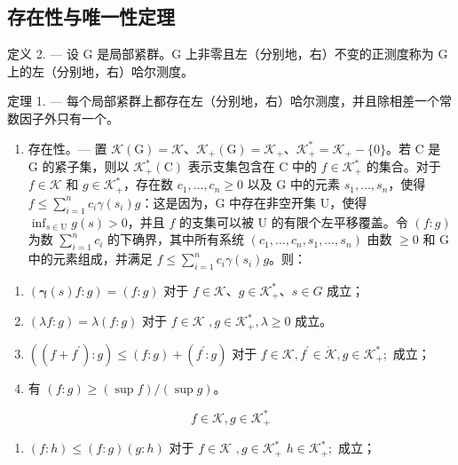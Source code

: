 \subsection{存在性与唯一性定理}

定义 2. --- 设 G 是局部紧群。G 上非零且左（分别地，右）不变的正测度称为 G 上的左（分别地，右）哈尔测度。

定理 1. --- 每个局部紧群上都存在左（分别地，右）哈尔测度，并且除相差一个常数因子外只有一个。

\begin{enumerate}
\def\labelenumi{\Alph{enumi})}
\tightlist
\item
  存在性。--- 置 \(\mathcal{K}(\mathrm{G}) = \mathcal{K}\)、\(\mathcal{K}_{+}(\mathrm{G}) = \mathcal{K}_{+}\)、\(\mathcal{K}_{+}^{*} = \mathcal{K}_{+} - \{0\}\)。若 C 是 G 的紧子集，则以 \(\mathcal{K}_{+}^{*}(\mathrm{C})\) 表示支集包含在 C 中的 \(f \in \mathcal{K}_{+}^{*}\) 的集合。对于 \(f \in \mathcal{K}\) 和 \(g \in \mathcal{K}_{+}^{*}\)，存在数 \(c_{1}, \ldots, c_{n} \geqslant 0\) 以及 G 中的元素 \(s_{1}, \ldots, s_{n}\)，使得 \(f \leqslant \sum_{i=1}^{n} c_{i} \gamma(s_{i}) g\)：这是因为，G 中存在非空开集 U，使得 \(\inf_{s \in \mathrm{U}} g(s) > 0\)，并且 \(f\) 的支集可以被 U 的有限个左平移覆盖。令 \((f : g)\) 为数 \(\sum_{i=1}^{n} c_{i}\) 的下确界，其中所有系统 \((c_{1}, \ldots, c_{n}, s_{1}, \ldots, s_{n})\) 由数 \(\geqslant 0\) 和 G 中的元素组成，并满足 \(f \leqslant \sum_{i=1}^{n} c_{i} \gamma(s_{i}) g\)。则：
\end{enumerate}

\begin{enumerate}
\def\labelenumi{(\roman{enumi})}
\item
  \(\left(\pmb{\gamma}(s)f:g\right) = (f:g)\) 对于 \(f\in \mathcal{K}\)、\(g\in \mathcal{K}_{+}^{*}\)、\(s\in G\) 成立；
\item
  \((\lambda f:g) = \lambda (f:g)\) 对于 \(f\in \mathcal{K}\) \(,g\in \mathcal{K}_{+}^{*},\lambda \geqslant 0\) 成立。
\item
  \(\left((f + f^{\prime}):g\right)\leqslant (f:g) + (f^{\prime}:g)\) 对于 \(f\in \mathcal{K},f^{\prime}\in \dot{\mathcal{K}},g\in \mathcal{K}_{+}^{*};\) 成立；
\item
  有 \((f:g)\geqslant (\sup f) / (\sup g)\)。
\end{enumerate}

\[
f \in \mathscr {K}, g \in \mathscr {K} _ {+} ^ {*}
\]

\begin{enumerate}
\def\labelenumi{(\alph{enumi})}
\setcounter{enumi}{21}
\tightlist
\item
  \((f:h)\leqslant (f:g)(g:h)\) 对于 \(f\in \mathcal{K}\) \(,g\in \mathcal{K}_{+}^{*}\) \(h\in \mathcal{K}_{+}^{*};\) 成立；
\end{enumerate}

